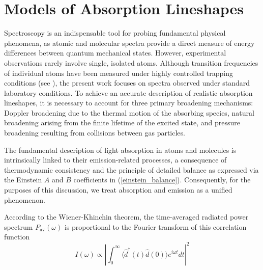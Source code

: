 \documentclass[8pt,a4paper]{report}
\begin{document}
	\section{Models of Absorption Lineshapes}
	Spectroscopy is an indispensable tool for probing fundamental physical phenomena, as atomic and molecular spectra provide a direct measure of energy differences between quantum mechanical states. However, experimental observations rarely involve single, isolated atoms. Although transition frequencies of individual atoms have been measured under highly controlled trapping conditions (see \cite{ours_single_mg_comb_line}), the present work focuses on spectra observed under standard laboratory conditions. To achieve an accurate description of realistic absorption lineshapes, it is necessary to account for three primary broadening mechanisms: Doppler broadening due to the thermal motion of the absorbing species, natural broadening arising from the finite lifetime of the excited state, and pressure broadening resulting from collisions between gas particles.
	
	The fundamental description of light absorption in atoms and molecules is intrinsically linked to their emission-related processes, a consequence of thermodynamic consistency and the principle of detailed balance as expressed via the Einstein $A$ and $B$ coefficients in (\ref{einstein_balance}). Consequently, for the purposes of this discussion, we treat absorption and emission as a unified phenomenon.
	
	According to the Wiener-Khinchin theorem, the time-averaged radiated power spectrum $P_{\text{av}}(\omega)$ is proportional to the Fourier transform of this correlation function \cite{book_born_and_wolf_princpOptics}
	\begin{equation}
		I(\omega) \propto \left| \int_{0}^{\infty} \langle \hat{d}^\dagger(t)\hat{d}(0) \rangle e^{i\omega t} dt \right|^2
	\end{equation}
	
	
\end{document}
